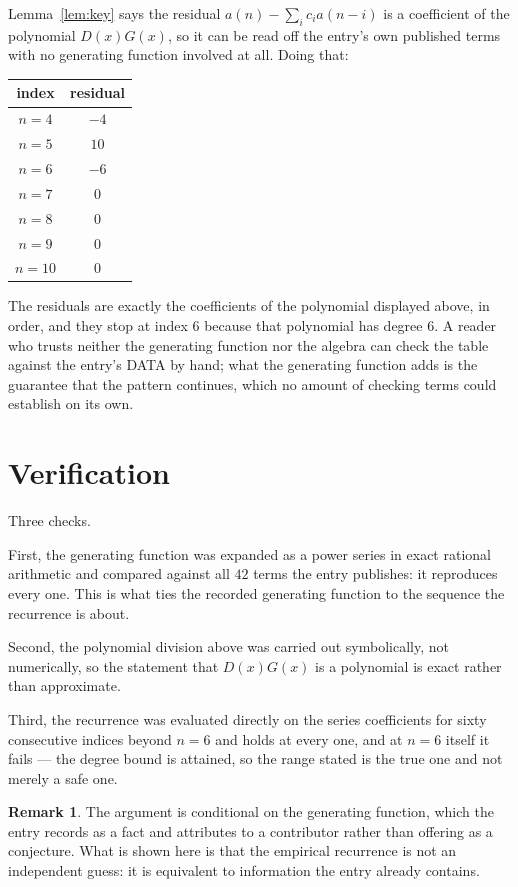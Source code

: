\documentclass[11pt,a4paper]{article}
\theoremstyle{plain}
\theoremstyle{definition}
\newtheorem{remark}[theorem]{Remark}
\begin{document}
Lemma~\ref{lem:key} says the residual $a(n)-\sum_ic_ia(n-i)$ is a coefficient of the
polynomial $D(x)G(x)$, so it can be read off the entry's own published terms with no
generating function involved at all. Doing that:
\begin{center}
\begin{tabular}{cc}
index & residual \\ \hline
$n=4$ & $-4$ \\
$n=5$ & $10$ \\
$n=6$ & $-6$ \\
$n=7$ & $0$ \\
$n=8$ & $0$ \\
$n=9$ & $0$ \\
$n=10$ & $0$
\end{tabular}
\end{center}
The residuals are exactly the coefficients of the polynomial displayed above, in order, and
they stop at index $6$ because that polynomial has degree $6$. A reader who trusts
neither the generating function nor the algebra can check the table against the entry's DATA
by hand; what the generating function adds is the guarantee that the pattern continues, which
no amount of checking terms could establish on its own.

\section{Verification}

Three checks.

First, the generating function was expanded as a power series in exact rational arithmetic and
compared against all $42$ terms the entry publishes: it reproduces every one. This is
what ties the recorded generating function to the sequence the recurrence is about.

Second, the polynomial division above was carried out symbolically, not numerically, so the
statement that $D(x)G(x)$ is a polynomial is exact rather than approximate.

Third, the recurrence was evaluated directly on the series coefficients for sixty consecutive
indices beyond $n=6$ and holds at every one, and at $n=6$ itself it fails --- the
degree bound is attained, so the range stated is the true one and not merely a safe one.

\begin{remark}
The argument is conditional on the generating function, which the entry records as a fact and
attributes to a contributor rather than offering as a conjecture. What is shown here is that
the empirical recurrence is not an independent guess: it is equivalent to information the
entry already contains.
\end{remark}
\end{document}
